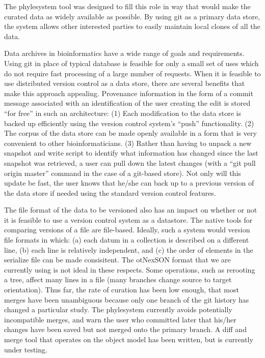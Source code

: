 \documentclass{bioinfo}
\newcommand{\ps}{phylesystem\xspace}
\newcommand{\nexson}{otNexSON\xspace}
\begin{document}
The \ps tool was designed to fill this role in way that would make the curated data as widely available
    as possible.
By using git as a primary data store, the system allows other interested parties to easily maintain
    local clones of all the data.

Data archives in bioinformatics have a wide range of goals and requirements.
Using git in place of typical database is feasible for only a small set of uses which do not require
    fast processing of a large number of requests.
When it is feasible to use distributed version control as a data store, there are several benefits
    that make this approach appealing.
Provenance information in the form of a commit message associated with an identification of the 
    user creating the edit is stored ``for free'' in such an architecture:
(1) Each modification to the data store is backed up efficiently using the version control system's ``push'' functionality.
(2) The corpus of the data store can be made openly available in a form that is very convenient to
    other bioinformaticians.
(3) Rather than having to unpack a new snapshot and write script to identify
    what information has changed since the last snapshot was retrieved, a user can pull down
    the latest changes (with a ``git pull origin master'' command in the case of a git-based store).
Not only will this update be fast, the user knows that he/she can back up to a previous version of the 
    data store if needed using the standard version control features.

The file format of the data to be versioned also has an impact on whether or not it is feasible
    to use a version control system as a datastore.
The native tools for comparing versions of a file are file-based.
Ideally, such a system would version file formats in which:
    (a) each datum in a collection is described on a different line, 
    (b) each line is relatively independent, and 
    (c) the order of elements in the serialize file can be made consisitent.
The \nexson format that we are currently using is not ideal in these respects.
Some operations, such as rerooting a tree,
    affect many lines in a file (many branches change source to target orientation).
Thus far, the rate of curation has been low enough, that most merges have been unambiguous because
    only one branch of the git history has changed a particular study.
The \ps currently avoids potentially incompatible merges, and warn the user who committed later that his/her
    changes have been saved but not merged onto the primary branch.
A diff and merge tool that operates on the object model has been written, but is currently under testing.
\end{document}
